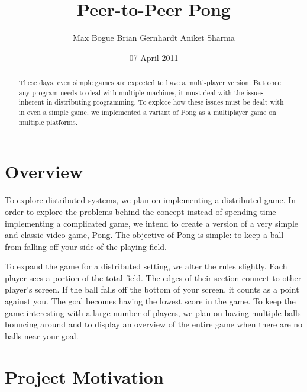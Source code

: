 \documentclass{sig-alternate}
\begin{document}
\title{Peer-to-Peer Pong}
\author{
\alignauthor
Max Bogue
\alignauthor
Brian Gernhardt
\alignauthor
Aniket Sharma
}
\date{07 April 2011}
\maketitle

\begin{abstract}
	These days, even simple games are expected to have a multi-player
	version.  But once any program needs to deal with multiple machines,
	it must deal with the issues inherent in distributing programming.  To
	explore how these issues must be dealt with in even a simple game, we
	implemented a variant of Pong as a multiplayer game on multiple
	platforms.
\end{abstract}

\section{Overview}
\label{overview}


To explore distributed systems, we plan on implementing a distributed game.
In order to explore the problems behind the concept instead of spending
time implementing a complicated game, we intend to create a version of a
very simple and classic video game, Pong.  The objective of Pong is simple:
to keep a ball from falling off your side of the playing field.

To expand the game for a distributed setting, we alter the rules slightly.
Each player sees a portion of the total field.  The edges of their section
connect to other player's screen.  If the ball falls off the bottom of your
screen, it counts as a point against you.  The goal becomes having the
lowest score in the game.  To keep the game interesting with a large number
of players, we plan on having multiple balls bouncing around and to display
an overview of the entire game when there are no balls near your goal.


\section{Project Motivation}
\label{motivation}
\end{document}
